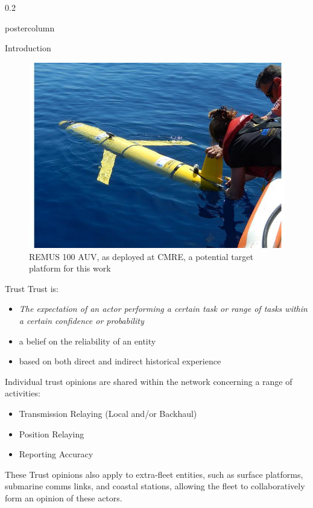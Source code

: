 \documentclass[final,hyperref={pdfpagelabels=false}]{beamer}
\def\colwidth{0.2\linewidth}
\begin{document}
\begin{frame}[fragile]
\begin{columns}[T]
\begin{column}{\colwidth}
\begin{beamercolorbox}[center,wd=\textwidth]{postercolumn}
\begin{minipage}[T]{.98\textwidth}
{\begin{block}{Introduction}
							\begin{figure}[h]
								\centering
								\includegraphics[width=0.6\linewidth]{remus100cmre}
								\vspace{1ex}
								\caption{REMUS 100 AUV, as deployed at CMRE, a potential target platform for this work}
							\end{figure}
						\end{block}
						\begin{block}{Trust}
							Trust is:
							\begin{itemize}
								\item \emph{The expectation of an actor performing a certain task or range of tasks within a certain confidence or probability}
								\item a belief on the reliability of an entity
								\item based on both direct and indirect historical experience
							\end{itemize}
							\vspace{0.3\baselineskip}
							
							Individual trust opinions are shared within the network concerning a range of activities:
							\begin{itemize}
								\item Transmission Relaying (Local and/or Backhaul)
								\item Position Relaying
								\item Reporting Accuracy
							\end{itemize}
							\vspace{0.3\baselineskip}
							
							These Trust opinions also apply to extra-fleet entities, such as surface platforms, submarine comms links, and coastal stations, allowing the fleet to collaboratively form an opinion of these actors.
							
						\end{block}
					}
				\end{minipage}
			\end{beamercolorbox}
		\end{column}
		

\end{columns}
\end{frame}
\end{document}
